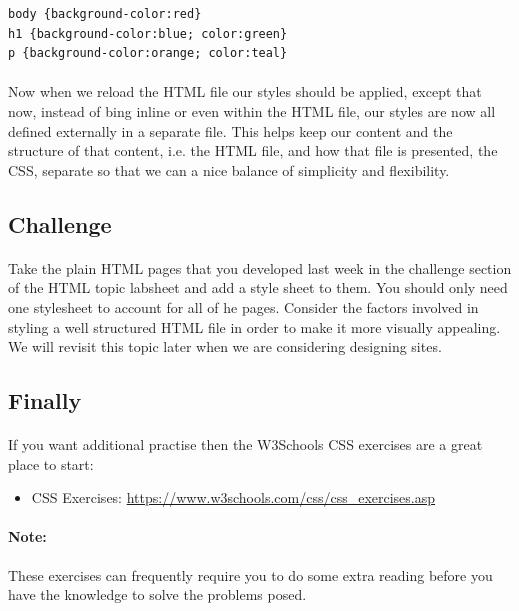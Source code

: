 \documentclass[10pt, a4paper, twosize]{article}
\begin{document}
\begin{lstlisting}
body {background-color:red}
h1 {background-color:blue; color:green}
p {background-color:orange; color:teal}
\end{lstlisting}

\paragraph{} Now when we reload the HTML file our styles should be applied, except that now, instead of bing inline or even within the HTML file, our styles are now all defined externally in a separate file. This helps keep our content and the structure of that content, i.e. the HTML file, and how that file is presented, the CSS, separate so that we can a nice balance of simplicity and flexibility.

\subsection{Challenge}
\paragraph{}Take the plain HTML pages that you developed last week in the challenge section of the HTML topic labsheet and add a style sheet to them. You should only need one stylesheet to account for all of he pages. Consider the factors involved in styling a well structured HTML file in order to make it more visually appealing. We will revisit this topic later when we are considering designing sites.

\subsection{Finally}
\paragraph{} If you want additional practise then the W3Schools CSS exercises are a great place to start:
\begin{itemize}
\item CSS Exercises: \url{https://www.w3schools.com/css/css_exercises.asp}
\end{itemize}

\paragraph{Note:} These exercises can frequently require you to do some extra reading before you have the knowledge to solve the problems posed.
\end{document}
